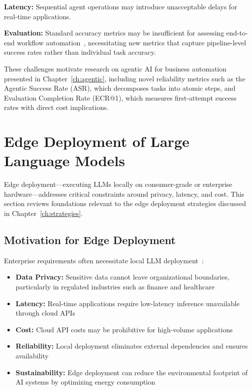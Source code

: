 \textbf{Latency:} Sequential agent operations may introduce unacceptable delays for real-time applications.

\textbf{Evaluation:} Standard accuracy metrics may be insufficient for assessing end-to-end workflow automation~\cite{jeyakumar2024advancing,putta2024agent}, necessitating new metrics that capture pipeline-level success rates rather than individual task accuracy.%

These challenges motivate research on agentic AI for business automation presented in Chapter~\ref{ch:agentic}, including novel reliability metrics such as the Agentic Success Rate (ASR), which decomposes tasks into atomic steps, and Evaluation Completion Rate (ECR@1), which measures first-attempt success rates with direct cost implications.

\section{Edge Deployment of Large Language Models}
\label{sec:lit_edge}

Edge deployment---executing LLMs locally on consumer-grade or enterprise hardware---addresses critical constraints around privacy, latency, and cost. This section reviews foundations relevant to the edge deployment strategies discussed in Chapter~\ref{ch:strategies}.

\subsection{Motivation for Edge Deployment}

Enterprise requirements often necessitate local LLM deployment~\cite{zheng2024edgellm,meuser2024revisiting}:

\begin{itemize}[leftmargin=*]
    \item \textbf{Data Privacy:} Sensitive data cannot leave organizational boundaries, particularly in regulated industries such as finance and healthcare
    \item \textbf{Latency:} Real-time applications require low-latency inference unavailable through cloud APIs
    \item \textbf{Cost:} Cloud API costs may be prohibitive for high-volume applications
    \item \textbf{Reliability:} Local deployment eliminates external dependencies and ensures availability
    \item \textbf{Sustainability:} Edge deployment can reduce the environmental footprint of AI systems by optimizing energy consumption~\cite{dhar2024empirical}
\end{itemize}

